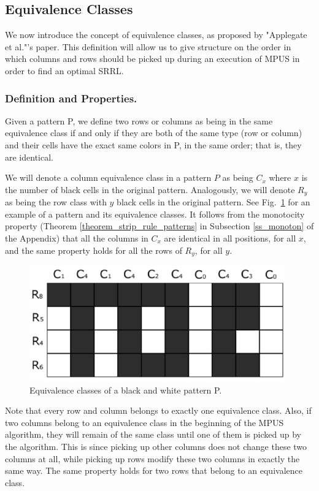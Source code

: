 \subsection{Equivalence Classes}
\label{ss_equiv}

We now introduce the concept of equivalence classes, as proposed by "Applegate et al."'s paper. This definition will allow us to give structure on the order in which columns and rows should be picked up during an execution of MPUS in order to find an optimal SRRL.

\subsubsection{Definition and Properties.}
Given a pattern P, we define two rows or columns as being in the same equivalence class if and only if they are both of the same type (row or column) and their cells have the exact same colors in P, in the same order; that is, they are identical.

We will denote a column equivalence class in a pattern $P$ as being $C_{x}$ where $x$ is the number of black cells in the original pattern. Analogously, we will denote $R_{y}$ as being the row class with $y$ black cells in the original pattern. See Fig.~\ref{fig:equiv_classes_example} for an example of a pattern and its equivalence classes.
It follows from the monotocity property (Theorem
\ref{theorem_strip_rule_patterns}
in Subsection \ref{ss_monoton} of the Appendix)
 that all the columns in $C_x$ are identical in all
positions, for all $x$, and the same property holds for all the rows of $R_y$,
for all $y$.

\begin{figure}[h]
\centering
\includegraphics[height=5cm]{equiv_classes_example}
\caption{Equivalence classes of a black and white pattern P.}
\label{fig:equiv_classes_example}
\end{figure}

Note that every row and column belongs to exactly one equivalence class. Also, if two columns belong to an equivalence class in the beginning of the MPUS algorithm, they will remain of the same class until one of them is picked up
by the algorithm. This is since picking up other columns does not
change these two columns at all, while picking up rows modify these
two columns in exactly the same way. The same property holds for two
rows that belong to an equivalence class.

